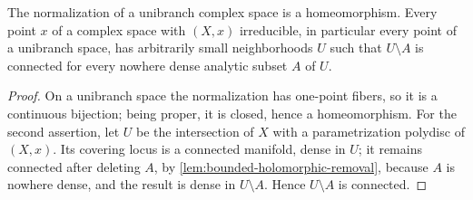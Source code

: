 \begin{corollary}\label{cor:unibranch-normalization-topology}
The normalization of a unibranch complex space is a homeomorphism. Every point $x$ of a complex space with $(X,x)$ irreducible, in particular every point of a unibranch space, has arbitrarily small neighborhoods $U$ such that $U\setminus A$ is connected for every nowhere dense analytic subset $A$ of $U$.
\end{corollary}
\begin{proof}
On a unibranch space the normalization has one-point fibers, so it is a continuous bijection; being proper, it is closed, hence a homeomorphism. For the second assertion, let $U$ be the intersection of $X$ with a parametrization polydisc of $(X,x)$. Its covering locus is a connected manifold, dense in $U$; it remains connected after deleting $A$, by \cref{lem:bounded-holomorphic-removal}, because $A$ is nowhere dense, and the result is dense in $U\setminus A$. Hence $U\setminus A$ is connected.
\end{proof}

